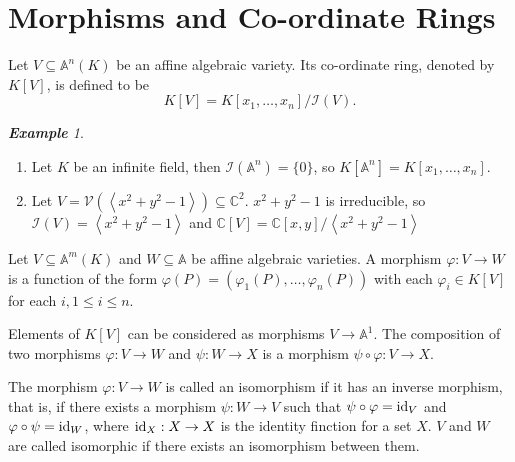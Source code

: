 \documentclass[titlepage]{article}
\theoremstyle{remark}
\newtheorem{example}[definition]{\textbf{Example}}
\newcommand{\id}[1][]{\ifx#1\empty\operatorname{id}\else\operatorname{id}_{#1}\fi}
\renewcommand{\phi}{\varphi}
\begin{document}
\section{Morphisms and Co-ordinate Rings}
  \begin{definition}
    Let $V\subseteq \mathbb{A}^n(K)$ be an affine algebraic variety. Its co-ordinate ring, denoted by $K[V]$, is defined to be 
    \[K[V]=K[x_1,\dots,x_n]/\mathcal{I}(V).\]
  \end{definition}
  \begin{example}$ $
    \begin{enumerate}
      \item Let $K$ be an infinite field, then $\mathcal{I}(\mathbb{A}^n)=\{0\}$, so $K[\mathbb{A}^n]=K[x_1,\dots,x_n]$.
      \item Let $V=\mathcal{V}\left(\left\langle x^2+y^2-1\right\rangle\right)\subseteq \mathbb{C}^2$. $x^2+y^2-1$ is irreducible, so $\mathcal{I}(V)=\left\langle x^2+y^2-1\right\rangle$ and $\mathbb{C}[V]=\mathbb{C}[x,y]/\left\langle x^2+y^2-1\right\rangle$
    \end{enumerate}
  \end{example}
  \begin{definition}
    Let $V\subseteq \mathbb{A}^m(K)$ and $W\subseteq\mathbb{A}$ be affine algebraic varieties. A morphism $\phi:V\to W$ is a function of the form $\phi(P)=(\phi_1(P),\dots,\phi_n(P))$ with each $\phi_i\in K[V]$ for each $i,1\le i\le n$.
  \end{definition}
  Elements of $K[V]$ can be considered as morphisms $V\to \mathbb{A}^1$.
  The composition of two morphisms $\phi:V\to W$ and $\psi:W\to X$ is a morphism $\psi\circ\phi:V\to X$.
  \begin{definition}
    The morphism $\phi:V\to W$ is called an isomorphism if it has an inverse morphism, that is, if there  exists a morphism $\psi:W\to V$ such that $\psi\circ\phi=\id[V]$ and $\phi\circ\psi=\id[W]$, where $\id[X]:X\to X$ is the identity finction for a set $X$. $V$ and $W$ are called isomorphic if there exists an isomorphism between them.
  \end{definition}
  \newpage
\end{document}
